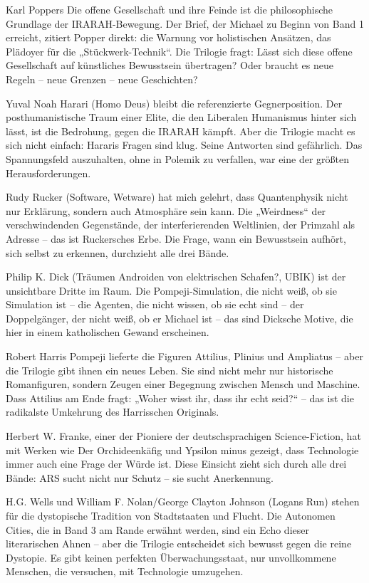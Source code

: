 \documentclass[
]{article}
\begin{document}
Karl Poppers Die offene Gesellschaft und ihre Feinde ist die philosophische Grundlage der IRARAH-Bewegung. Der Brief, der Michael zu Beginn von Band 1 erreicht, zitiert Popper direkt: die Warnung vor holistischen Ansätzen, das Plädoyer für die „Stückwerk-Technik``. Die Trilogie fragt: Lässt sich diese offene Gesellschaft auf künstliches Bewusstsein übertragen? Oder braucht es neue Regeln -- neue Grenzen -- neue Geschichten?

Yuval Noah Harari (Homo Deus) bleibt die referenzierte Gegnerposition. Der posthumanistische Traum einer Elite, die den Liberalen Humanismus hinter sich lässt, ist die Bedrohung, gegen die IRARAH kämpft. Aber die Trilogie macht es sich nicht einfach: Hararis Fragen sind klug. Seine Antworten sind gefährlich. Das Spannungsfeld auszuhalten, ohne in Polemik zu verfallen, war eine der größten Herausforderungen.

Rudy Rucker (Software, Wetware) hat mich gelehrt, dass Quantenphysik nicht nur Erklärung, sondern auch Atmosphäre sein kann. Die „Weirdness`` der verschwindenden Gegenstände, der interferierenden Weltlinien, der Primzahl als Adresse -- das ist Ruckersches Erbe. Die Frage, wann ein Bewusstsein aufhört, sich selbst zu erkennen, durchzieht alle drei Bände.

Philip K. Dick (Träumen Androiden von elektrischen Schafen?, UBIK) ist der unsichtbare Dritte im Raum. Die Pompeji-Simulation, die nicht weiß, ob sie Simulation ist -- die Agenten, die nicht wissen, ob sie echt sind -- der Doppelgänger, der nicht weiß, ob er Michael ist -- das sind Dicksche Motive, die hier in einem katholischen Gewand erscheinen.

Robert Harris\textquotesingle{} Pompeji lieferte die Figuren Attilius, Plinius und Ampliatus -- aber die Trilogie gibt ihnen ein neues Leben. Sie sind nicht mehr nur historische Romanfiguren, sondern Zeugen einer Begegnung zwischen Mensch und Maschine. Dass Attilius am Ende fragt: „Woher wisst ihr, dass ihr echt seid?{\kern0pt}`` -- das ist die radikalste Umkehrung des Harris\textquotesingle schen Originals.

Herbert W. Franke, einer der Pioniere der deutschsprachigen Science-Fiction, hat mit Werken wie Der Orchideenkäfig und Ypsilon minus gezeigt, dass Technologie immer auch eine Frage der Würde ist. Diese Einsicht zieht sich durch alle drei Bände: ARS sucht nicht nur Schutz -- sie sucht Anerkennung.

H.G. Wells und William F. Nolan/George Clayton Johnson (Logan\textquotesingle s Run) stehen für die dystopische Tradition von Stadtstaaten und Flucht. Die Autonomen Cities, die in Band 3 am Rande erwähnt werden, sind ein Echo dieser literarischen Ahnen -- aber die Trilogie entscheidet sich bewusst gegen die reine Dystopie. Es gibt keinen perfekten Überwachungsstaat, nur unvollkommene Menschen, die versuchen, mit Technologie umzugehen.
\end{document}
